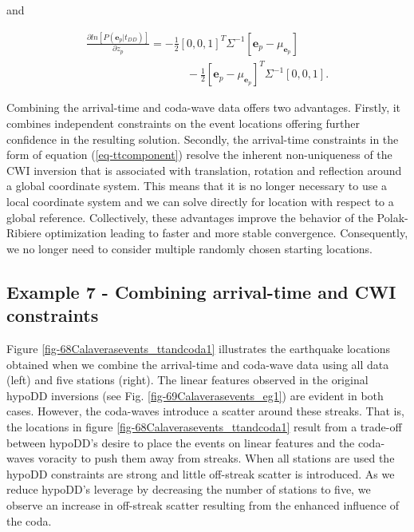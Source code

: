 \documentclass[12pt,double]{article}
\begin{document}
and
\begin{linenomath*} \begin{equation}
\begin{array}{l}
\frac{\partial ln\left[P(\mathbf{e}_p|t_{DD})\right]}{\partial z_p}
= -\frac{1}{2} [0,0,1]^T \Sigma^{-1}
[\mathbf{e}_p-\mu_{\mathbf{e}_p}] \\
\hspace{9em} -\frac{1}{2}
[\mathbf{e}_p-\mu_{\mathbf{e}_p}]^T \Sigma^{-1} [0,0,1].
\end{array}
\end{equation} \end{linenomath*}

Combining the arrival-time and coda-wave data offers two advantages.
Firstly, it combines independent constraints on the event locations
offering further confidence in the resulting solution. Secondly, the
arrival-time constraints in the form of equation
(\ref{eq-ttcomponent}) resolve the inherent non-uniqueness
of the CWI inversion that is associated with translation, rotation and reflection around a global
coordinate system. This means that it is no longer necessary to use
a local coordinate system and we can solve directly for location
with respect to a global reference. Collectively, these advantages
improve the behavior of the Polak-Ribiere optimization leading to
faster and more stable convergence. Consequently, we no longer need
to consider multiple randomly chosen starting locations.

\vspace{1em}
\subsection*{Example 7 - Combining arrival-time and CWI constraints}
Figure
\ref{fig-68Calaverasevents_ttandcoda1} illustrates the earthquake
locations obtained when we combine the arrival-time and coda-wave
data using all data (left) and five stations (right). The linear
features observed in the original hypoDD inversions (see Fig.
\ref{fig-69Calaverasevents_eg1}) are evident in both cases. However,
the coda-waves introduce a scatter around these streaks. That is,
the locations in figure \ref{fig-68Calaverasevents_ttandcoda1}
result from a trade-off between hypoDD's desire to place the events
on linear features and the coda-waves voracity to push them away
from streaks. When all stations are used the hypoDD constraints are
strong and little off-streak scatter is introduced. As we reduce
hypoDD's leverage by decreasing the number of stations to five, we
observe an increase in off-streak scatter resulting from the
enhanced influence of the coda.
\end{document}
